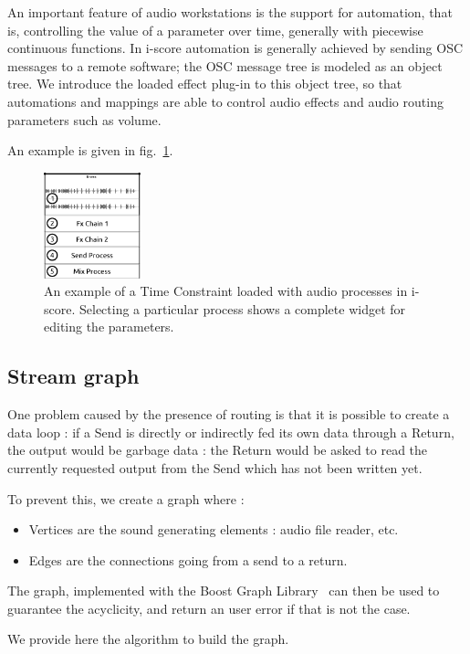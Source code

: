 \documentclass{article}
\begin{document}
An important feature of audio workstations is the support for automation, that is, 
controlling the value of a parameter over time, generally with piecewise continuous functions.
In i-score automation is generally achieved by sending OSC messages to a remote software;
the OSC message tree is modeled as an object tree.
We introduce the loaded effect plug-in to this object tree, so that automations 
and mappings are able to control audio effects and audio routing parameters such as volume.

An example is given in fig.~\ref{fig.iscoreconstraint}.
\begin{figure}
	\centering
	\includegraphics[width=0.25\textwidth]{figures/iscore1.eps}
	\caption{An example of a Time Constraint loaded with audio processes in i-score. 
		Selecting a particular process shows a complete widget for editing the parameters.}
	\label{fig.iscoreconstraint}
\end{figure}
\subsection{Stream graph}
One problem caused by the presence of routing is that it is possible 
to create a data loop : if a Send is directly or indirectly fed its own data through a Return, 
the output would be garbage data : the Return would be asked to read 
the currently requested output from the Send which has not been written yet.

To prevent this, we create a graph where : 
\begin{itemize}
	\item Vertices are the sound generating elements : audio file reader, etc.
	\item Edges are the connections going from a send to a return.
\end{itemize} 

The graph, implemented with the Boost Graph Library~\cite{siek2001boost} can then be used to 
guarantee the acyclicity, and return an user error if that is not the case.

We provide here the algorithm to build the graph.
\end{document}

